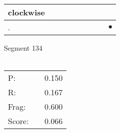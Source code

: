 \documentclass[landscape]{article}
\newcommand{\ssp}{\hspace{2pt}}
\newcommand{\mex}{\cellcolor{g}$\bullet$}
\begin{document}
\begin{tabular}{|l|p{10pt}|p{10pt}|p{10pt}|p{10pt}|p{10pt}|p{10pt}|p{10pt}|p{10pt}|}
\hline
\ssp clockwise \ssp&\hspace{2pt}&\hspace{2pt}&\hspace{2pt}&\hspace{2pt}&\hspace{2pt}&\hspace{2pt}&\hspace{2pt}&\hspace{2pt}\\
\hline
\ssp \cellcolor{ref7}. \ssp&\hspace{2pt}&\hspace{2pt}&\hspace{2pt}&\hspace{2pt}&\hspace{2pt}&\hspace{2pt}&\hspace{2pt}&\hspace{2pt}\mex\\
\hline
\end{tabular}

\vspace{6pt}
\noindent Segment 134\\\\
\noindent\begin{tabular}{lm{12pt}r}
\hline
P:&&0.150\\
R:&&0.167\\
Frag:&&0.600\\
Score:&&0.066\\
\end{tabular}

\newpage
\end{document}
